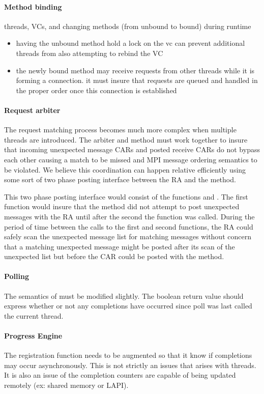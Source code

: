 \paragraph{Method binding} threads, VCs, and changing methods (from unbound
to bound) during runtime
\begin{itemize}
\item having the unbound method hold a lock on the vc can prevent additional
  threads from also attempting to rebind the VC
\item the newly bound method may receive requests from other threads while it
  is forming a connection.  it must insure that requests are queued and handled
  in the proper order once this connection is established
\end{itemize}

\paragraph{Request arbiter} The request matching process becomes much more
complex when multiple threads are introduced.  The arbiter and method must work
together to insure that incoming unexpected message CARs and posted receive
CARs do not bypass each other causing a match to be missed and MPI message
ordering semantics to be violated.  We believe this coordination can happen
relative efficiently using some sort of two phase posting interface between the
RA and the method.

This two phase posting interface would consist of the functions
 and .  The first
function would insure that the method did not attempt to post unexpected
messages with the RA until after the second the function was called.  During
the period of time between the calls to the first and second functions, the RA
could safely scan the unexpected message list for matching messages without
concern that a matching unexpected message might be posted after its scan of
the unexpected list but before the CAR could be posted with the method.

\paragraph{Polling} The semantics of  must be modified
slightly.  The boolean return value should express whether or not any
completions have occurred since poll was last called the current thread.

\paragraph{Progress Engine} The registration function needs to be augmented so
that it know if completions may occur asynchronously.  This is not strictly an
issues that arises with threads.  It is also an issue of the completion
counters are capable of being updated remotely (ex: shared memory or LAPI).

